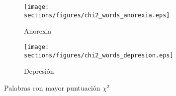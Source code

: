 \begin{figure}[hbt!]
\centering
 \begin{subfigure}[b]{0.7\textwidth}
        \texttt{[image: sections/figures/chi2\_words\_anorexia.eps]}
        \caption{Anorexia}
\end{subfigure}
\hfill
\hfill
 \begin{subfigure}[b]{0.7\textwidth}
        \texttt{[image: sections/figures/chi2\_words\_depresion.eps]}
        \caption{Depresión}
\end{subfigure}
  
    \caption{Palabras con mayor puntuación $\chi^2$}
    \label{fig:words_chi_anox}
\end{figure}